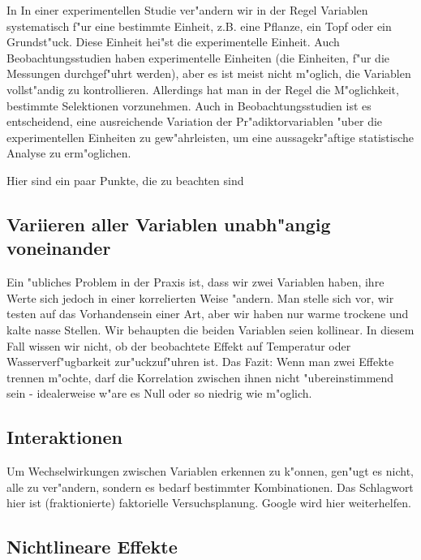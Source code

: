 \documentclass[a4paper,twoside]{tufte-book}\usepackage[]{graphicx}\usepackage[]{color}
\begin{document}
In In einer experimentellen Studie ver"andern wir in der Regel Variablen systematisch f"ur eine bestimmte Einheit, z.B. eine Pflanze, ein Topf oder ein Grundst"uck. Diese Einheit hei"st die experimentelle Einheit. Auch Beobachtungsstudien haben experimentelle Einheiten (die Einheiten, f"ur die Messungen durchgef"uhrt werden), aber es ist meist nicht m"oglich, die Variablen vollst"andig zu kontrollieren. Allerdings hat man in der Regel die M"oglichkeit, bestimmte Selektionen vorzunehmen. Auch in Beobachtungsstudien ist es entscheidend, eine ausreichende Variation der Pr"adiktorvariablen "uber die experimentellen Einheiten zu gew"ahrleisten, um eine aussagekr"aftige statistische Analyse zu erm"oglichen.

Hier sind ein paar Punkte, die zu beachten sind

\subsection{Variieren aller Variablen unabh"angig voneinander}

Ein "ubliches Problem in der Praxis ist, dass wir zwei Variablen haben, ihre Werte sich jedoch in einer korrelierten Weise "andern. Man stelle sich vor, wir testen auf das Vorhandensein einer Art, aber wir haben nur warme trockene und kalte nasse Stellen. Wir behaupten die beiden Variablen seien kollinear. In diesem Fall wissen wir nicht, ob der beobachtete Effekt auf Temperatur oder Wasserverf"ugbarkeit zur"uckzuf"uhren ist. Das Fazit: Wenn man zwei Effekte trennen m"ochte, darf die Korrelation zwischen ihnen nicht "ubereinstimmend sein - idealerweise w"are es Null oder so niedrig wie m"oglich. 

\subsection{Interaktionen}

Um Wechselwirkungen zwischen Variablen erkennen zu k"onnen, gen"ugt es nicht, alle zu ver"andern, sondern es bedarf bestimmter Kombinationen. Das Schlagwort hier ist (fraktionierte) faktorielle Versuchsplanung. Google wird hier weiterhelfen.

\subsection{Nichtlineare Effekte}
\end{document}
